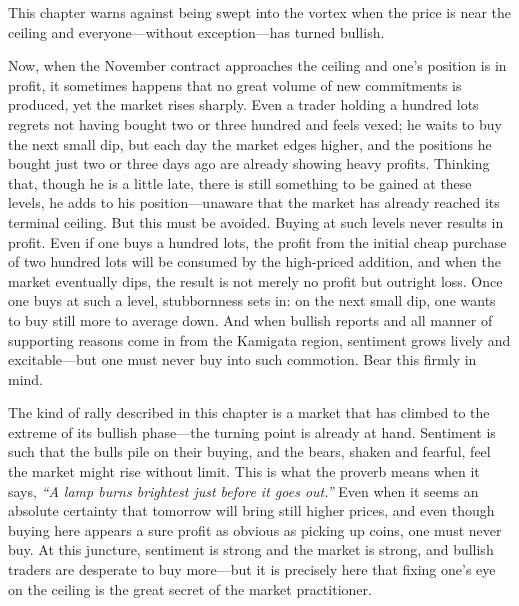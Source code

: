 \commentary
This chapter warns against being swept into the vortex when the
price is near the ceiling and everyone---without exception---has
turned bullish.

Now, when the November contract approaches the ceiling and one's
position is in profit, it sometimes happens that no great volume of
new commitments is produced, yet the market rises sharply. Even a
trader holding a hundred lots regrets not having bought two or
three hundred and feels vexed; he waits to buy the next small dip,
but each day the market edges higher, and the positions he bought
just two or three days ago are already showing heavy profits.
Thinking that, though he is a little late, there is still something
to be gained at these levels, he adds to his position---unaware
that the market has already reached its terminal ceiling. But this
must be avoided. Buying at such levels never results in profit.
Even if one buys a hundred lots, the profit from the initial cheap
purchase of two hundred lots will be consumed by the high-priced
addition, and when the market eventually dips, the result is not
merely no profit but outright loss. Once one buys at such a level,
stubbornness sets in: on the next small dip, one wants to buy
still more to average down. And when bullish reports and all manner
of supporting reasons come in from the Kamigata region, sentiment
grows lively and excitable---but one must never buy into such
commotion. Bear this firmly in mind.

The kind of rally described in this chapter is a market that has
climbed to the extreme of its bullish phase---the turning point is
already at hand. Sentiment is such that the bulls pile on their
buying, and the bears, shaken and fearful, feel the market might
rise without limit. This is what the proverb means when it says,
\textit{``A lamp burns brightest just before it goes out.''} Even when it
seems an absolute certainty that tomorrow will bring still higher
prices, and even though buying here appears a sure profit as
obvious as picking up coins, one must never buy. At this juncture,
sentiment is strong and the market is strong, and bullish traders
are desperate to buy more---but it is precisely here that fixing
one's eye on the ceiling is the great secret of the market
practitioner.


